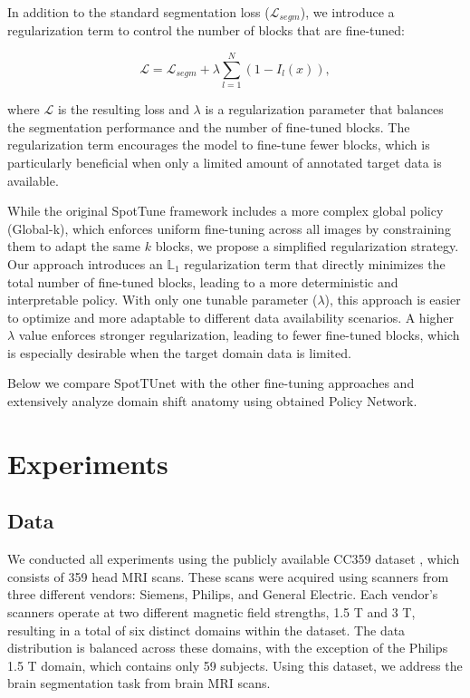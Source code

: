 In addition to the standard segmentation loss ($\mathcal{L}_{segm}$), we introduce a regularization term to control the number of blocks that are fine-tuned:

\begin{equation}
	\mathcal{L} = \mathcal{L}_{segm} + \lambda \sum_{l=1}^N \left( 1 - I_l (x) \right),
\end{equation}

\noindent
where $\mathcal{L}$ is the resulting loss and $\lambda$ is a regularization parameter that balances the segmentation performance and the number of fine-tuned blocks. The regularization term encourages the model to fine-tune fewer blocks, which is particularly beneficial when only a limited amount of annotated target data is available. %

While the original SpotTune framework includes a more complex global policy (Global-k), which enforces uniform fine-tuning across all images by constraining them to adapt the same $k$ blocks, we propose a simplified regularization strategy. Our approach introduces an $\mathbb{L}_1$ regularization term that directly minimizes the total number of fine-tuned blocks, leading to a more deterministic and interpretable policy. With only one tunable parameter ($\lambda$), this approach is easier to optimize and more adaptable to different data availability scenarios. A higher $\lambda$ value enforces stronger regularization, leading to fewer fine-tuned blocks, which is especially desirable when the target domain data is limited.

Below we compare SpotTUnet with the other fine-tuning approaches and extensively analyze domain shift anatomy using obtained Policy Network.


\section{Experiments}


\subsection{Data}

We conducted all experiments using the publicly available CC359 dataset \cite{souza2018open}, which consists of 359 head MRI scans. These scans were acquired using scanners from three different vendors: Siemens, Philips, and General Electric. Each vendor's scanners operate at two different magnetic field strengths, 1.5 T and 3 T, resulting in a total of six distinct domains within the dataset. The data distribution is balanced across these domains, with the exception of the Philips 1.5 T domain, which contains only 59 subjects. Using this dataset, we address the brain segmentation task from brain MRI scans.

